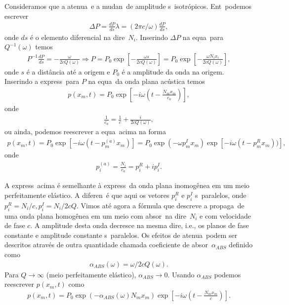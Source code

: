 Consideramos que a atenua\cao\ e a mudan\ca\ de amplitude s\ao\
isotr\'opicos. Ent\ao\ podemos escrever
\begin{eqnarray}
\Delta P = \frac{dP}{ds}\lambda = (2\pi c/\omega)\frac{dP}{ds},
\end{eqnarray}
onde $ds$ \'e o elemento diferencial na dire\cao\ $N_i$. Inserindo
$\Delta P$ na equa\cao\ para $Q^{-1}(\omega)$ temos
\begin{eqnarray}
P^{-1}\frac{dP}{ds} = -\frac{\omega}{2cQ(\omega)}\Rightarrow
P = P_0\exp\left[-\frac{\omega s}{2cQ(\omega)}\right] = P_0\exp\left[
-\frac{\omega N_i x_i}{2cQ(\omega)}\right],
\end{eqnarray}
onde $s$ \'e a dist\^ancia at\'e a origem e $P_0$ \'e a amplitude da
onda na origem. Inserindo a express\ao\ para $P$ na equa\cao\ da onda
plana ac\'ustica temos
\begin{eqnarray}
p(x_m,t) = P_0\exp\left[-i\omega\left(t -\frac{N_m x_m}{c_a}\right)\right],
\end{eqnarray}
onde
\begin{eqnarray}
\frac{1}{c_a} = \frac{1}{c} + \frac{i}{2cQ(\omega)},
\end{eqnarray}
ou ainda, podemos reescrever a equa\cao\ acima na forma
\begin{eqnarray}
p(x_m,t) = P_0\exp[-i\omega(t -p_m^{(a)}x_m)] = P_0\exp(-\omega p_m^I x_m)
\exp[-i\omega(t - p_m^R x_m))],
\end{eqnarray}
onde
\begin{eqnarray}
p_i^{(a)} = \frac{N_i}{c_a} = p_i^R + ip_i^I.
\end{eqnarray}

A express\ao\ acima \'e semelhante \`a express\ao\ da onda plana
inomog\^enea em um meio perfeitamente el\'astico. A diferen\ca\ \'e que
aqui os vetores $p_i^R$ e $p_i^I$ s\ao\ paralelos, onde $p_i^R = N_i/c,
p_i^I = N_i/2cQ$. Vimos at\'e agora a f\'ormula que descreve a
propaga\cao\ de uma onda plana homog\^enea em um meio com absor\cao\ na
dire\cao\ $N_i$ e com velocidade de fase $c$. A amplitude desta onda
decresce na mesma dire\cao, i.e., os planos de fase constante e
amplitude constante s\ao\ paralelos. Os efeitos de atenua\cao\ podem ser
descritos atrav\'es de outra quantidade chamada coeficiente de
absor\cao\ $\alpha_{ABS}$ definido como
\begin{eqnarray}
\alpha_{ABS}(\omega) = \omega/2cQ(\omega).
\end{eqnarray}
Para $Q \rightarrow \infty$ (meio perfeitamente el\'astico),
$\alpha_{ABS} \rightarrow 0$. Usando $\alpha_{ABS}$ podemos reescrever
$p(x_m,t)$ como
\begin{eqnarray}
p(x_m,t) = P_0\exp(-\alpha_{ABS}(\omega)N_m x_m)\exp\left[
-i\omega\left(t - \frac{N_m x_m}{c}\right)\right].
\end{eqnarray}

